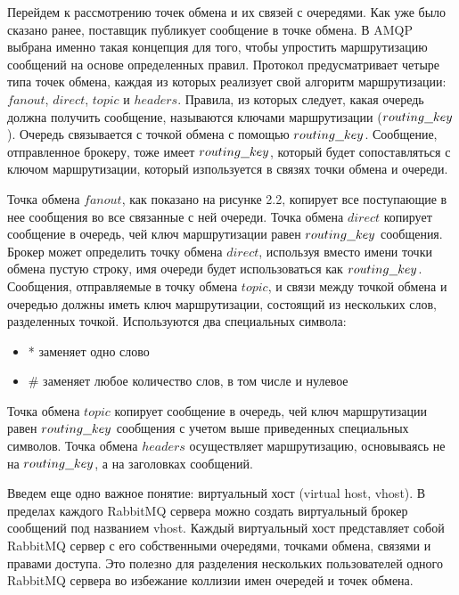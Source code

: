 Перейдем к рассмотрению точек обмена и их связей с очередями. Как уже было сказано ранее, поставщик публикует сообщение в точке обмена. В AMQP выбрана именно такая концепция для того, чтобы упростить маршрутизацию сообщений на основе определенных правил. Протокол предусматривает четыре типа точек обмена, каждая из которых реализует свой алгоритм маршрутизации: $fanout$, $direct$, $topic$ и $headers$. Правила, из которых следует, какая очередь должна получить сообщение, называются ключами маршрутизации ($routing\underline{\hspace{0.25cm}}key$). Очередь связывается с точкой обмена с помощью $routing\underline{\hspace{0.25cm}}key$. Сообщение, отправленное брокеру, тоже имеет  $routing\underline{\hspace{0.25cm}}key$, который будет сопоставляться с ключом маршрутизации, который изпользуется в связях точки обмена и очереди.\par
Точка обмена $fanout$, как показано на рисунке 2.2, копирует все поступающие в нее сообщения во все связанные с ней очереди. Точка обмена $direct$ копирует сообщение в очередь, чей ключ маршрутизации равен $routing\underline{\hspace{0.25cm}}key$ сообщения. Брокер может определить точку обмена $direct$, используя вместо имени точки обмена пустую строку, имя очереди будет использоваться как $routing\underline{\hspace{0.25cm}}key$. Сообщения, отправляемые в точку обмена $topic$, и связи между точкой обмена и очередью должны иметь ключ маршрутизации, состоящий из нескольких слов, разделенных точкой. Используются два специальных символа:
\begin{itemize}
\item * заменяет одно слово
\item \# заменяет любое количество слов, в том числе и нулевое
\end{itemize}
Точка обмена $topic$ копирует сообщение в очередь, чей ключ маршрутизации равен $routing\underline{\hspace{0.25cm}}key$ сообщения с учетом выше приведенных специальных символов. Точка обмена $headers$ осуществляет маршрутизацию, основываясь не на $routing\underline{\hspace{0.25cm}}key$, а на заголовках сообщений.\par
Введем еще одно важное понятие: виртуальный хост (virtual host, vhost). В пределах каждого RabbitMQ сервера можно создать виртуальный брокер сообщений под названием vhost. Каждый виртуальный хост представляет собой RabbitMQ сервер с его собственными очередями, точками обмена, связями и правами доступа. Это полезно для разделения нескольких пользователей одного RabbitMQ сервера во избежание коллизии имен очередей и точек обмена. 

